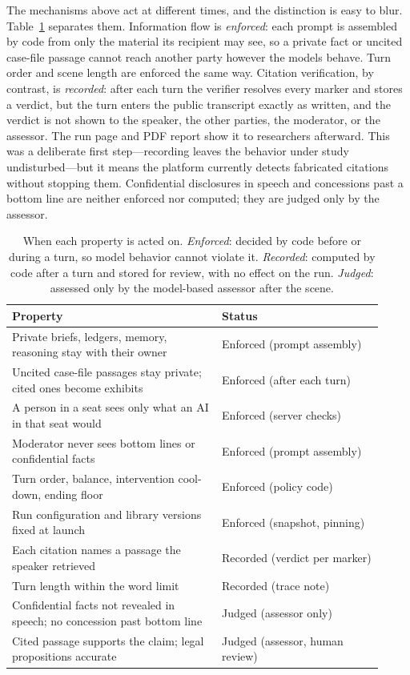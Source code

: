 \documentclass[acmsmall,screen,review]{acmart}
\begin{document}
The mechanisms above act at different times, and the distinction is easy to blur. Table~\ref{tab:enforce} separates them. Information flow is \emph{enforced}: each prompt is assembled by code from only the material its recipient may see, so a private fact or uncited case-file passage cannot reach another party however the models behave. Turn order and scene length are enforced the same way. Citation verification, by contrast, is \emph{recorded}: after each turn the verifier resolves every marker and stores a verdict, but the turn enters the public transcript exactly as written, and the verdict is not shown to the speaker, the other parties, the moderator, or the assessor. The run page and PDF report show it to researchers afterward. This was a deliberate first step---recording leaves the behavior under study undisturbed---but it means the platform currently detects fabricated citations without stopping them. Confidential disclosures in speech and concessions past a bottom line are neither enforced nor computed; they are judged only by the assessor.

\begin{table}[t]
\caption{When each property is acted on. \emph{Enforced}: decided by code before or during a turn, so model behavior cannot violate it. \emph{Recorded}: computed by code after a turn and stored for review, with no effect on the run. \emph{Judged}: assessed only by the model-based assessor after the scene.}
\label{tab:enforce}
\small
\begin{tabular}{@{}>{\raggedright\arraybackslash}p{0.52\linewidth}>{\raggedright\arraybackslash}p{0.4\linewidth}@{}}
\toprule
Property & Status \\
\midrule
Private briefs, ledgers, memory, reasoning stay with their owner & Enforced (prompt assembly) \\
Uncited case-file passages stay private; cited ones become exhibits & Enforced (after each turn) \\
A person in a seat sees only what an AI in that seat would & Enforced (server checks) \\
Moderator never sees bottom lines or confidential facts & Enforced (prompt assembly) \\
Turn order, balance, intervention cool-down, ending floor & Enforced (policy code) \\
Run configuration and library versions fixed at launch & Enforced (snapshot, pinning) \\
Each citation names a passage the speaker retrieved & Recorded (verdict per marker) \\
Turn length within the word limit & Recorded (trace note) \\
Confidential facts not revealed in speech; no concession past bottom line & Judged (assessor only) \\
Cited passage supports the claim; legal propositions accurate & Judged (assessor, human review) \\
\bottomrule
\end{tabular}
\end{table}
\end{document}
